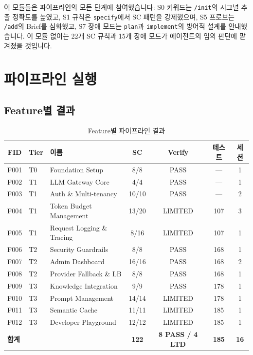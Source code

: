 \documentclass[11pt,a4paper,openright,twoside]{report}
\newcommand{\cmd}[1]{\texttt{/#1}}
\begin{document}
\begin{notebox}
이 모듈들은 파이프라인의 모든 단계에 참여했습니다: S0 키워드는 \cmd{init}의 시그널 추출 정확도를 높였고, S1 규칙은 \texttt{specify}에서 SC 패턴을 강제했으며, S5 프로브는 \cmd{add}의 Brief를 심화했고, S7 장애 모드는 \texttt{plan}과 \texttt{implement}의 방어적 설계를 안내했습니다. 이 모듈 없이는 22개 SC 규칙과 15개 장애 모드가 에이전트의 임의 판단에 맡겨졌을 것입니다.
\end{notebox}

\section{파이프라인 실행}

\subsection{Feature별 결과}

\begin{table}[H]
\centering
\caption{Feature별 파이프라인 결과}
\label{tab:aegis-features-ko}
\small
\begin{tabularx}{\textwidth}{clXcccc}
\toprule
\textbf{FID} & \textbf{Tier} & \textbf{이름} & \textbf{SC} & \textbf{Verify} & \textbf{테스트} & \textbf{세션} \\
\midrule
F001 & T0 & Foundation Setup & 8/8 & \textcolor{specgreen}{PASS} & --- & 1 \\
F002 & T1 & LLM Gateway Core & 4/4 & \textcolor{specgreen}{PASS} & --- & 1 \\
F003 & T1 & Auth \& Multi-tenancy & 10/10 & \textcolor{specgreen}{PASS} & --- & 2 \\
F004 & T1 & Token Budget Management & 13/20 & \textcolor{specorange}{LIMITED} & 107 & 3 \\
F005 & T1 & Request Logging \& Tracing & 8/16 & \textcolor{specorange}{LIMITED} & 107 & 1 \\
F006 & T2 & Security Guardrails & 8/8 & \textcolor{specgreen}{PASS} & 168 & 1 \\
F007 & T2 & Admin Dashboard & 16/16 & \textcolor{specgreen}{PASS} & 168 & 2 \\
F008 & T2 & Provider Fallback \& LB & 8/8 & \textcolor{specgreen}{PASS} & 168 & 1 \\
F009 & T3 & Knowledge Integration & 9/9 & \textcolor{specgreen}{PASS} & 178 & 1 \\
F010 & T3 & Prompt Management & 14/14 & \textcolor{specorange}{LIMITED} & 178 & 1 \\
F011 & T3 & Semantic Cache & 11/11 & \textcolor{specorange}{LIMITED} & 185 & 1 \\
F012 & T3 & Developer Playground & 12/12 & \textcolor{specorange}{LIMITED} & 185 & 1 \\
\midrule
\multicolumn{3}{l}{\textbf{합계}} & \textbf{122} & \textbf{8 PASS / 4 LTD} & \textbf{185} & \textbf{16} \\
\bottomrule
\end{tabularx}
\end{table}
\end{document}
